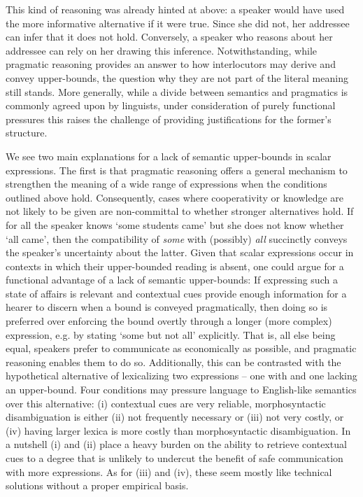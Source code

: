 \documentclass[10pt,a4paper]{article}
\begin{document}
This kind of reasoning was already hinted at above: a speaker would have used the more informative alternative if it were true. Since she did not, her addressee can infer that it does not hold. Conversely, a speaker who reasons about her addressee can rely on her drawing this inference. Notwithstanding, while pragmatic reasoning provides an answer to how interlocutors may derive and convey upper-bounds, the question why they are not part of the literal meaning still stands. More generally, while a divide between semantics and pragmatics is commonly agreed upon by linguists, under consideration of purely functional pressures this raises the challenge of providing justifications for the former's structure.

We see two main explanations for a lack of semantic upper-bounds in scalar expressions. The first is that pragmatic reasoning offers a general mechanism to strengthen the meaning of a wide range of expressions when the conditions outlined above hold. Consequently, cases where cooperativity or knowledge are not likely to be given are non-committal to whether stronger alternatives hold. If for all the speaker knows `some students came' but she does not know whether `all came', then the compatibility of {\em some} with (possibly) {\em all} succinctly conveys the speaker's uncertainty about the latter. Given that scalar expressions occur in contexts in which their upper-bounded reading is absent, one could argue for a functional advantage of a lack of semantic upper-bounds: If expressing such a state of affairs is relevant and contextual cues provide enough information for a hearer to discern when a bound is conveyed pragmatically, then doing so is preferred over enforcing the bound overtly through a longer (more complex) expression, e.g. by stating `some but not all' explicitly. That is, all else being equal, speakers prefer to communicate as economically as possible, and pragmatic reasoning enables them to do so. Additionally, this can be contrasted with the hypothetical alternative of lexicalizing two expressions -- one with and one lacking an upper-bound. Four conditions may pressure language to English-like semantics over this alternative: (i) contextual cues are very reliable, morphosyntactic disambiguation is either (ii) not frequently necessary or (iii) not very costly, or (iv) having larger lexica is more costly than morphosyntactic disambiguation. In a nutshell (i) and (ii) place a heavy burden on the ability to retrieve contextual cues to a degree that is unlikely to undercut the benefit of safe communication with more expressions. As for (iii) and (iv), these seem mostly like technical solutions without a proper empirical basis. 
\end{document}
